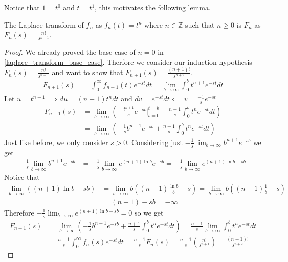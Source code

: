 \documentclass[notes]{subfiles}
\begin{document}
Notice that $1 = t^0$ and $t = t^1$, this motivates the following lemma.

\begin{lemma}
    The Laplace transform of $f_n$ as $f_n(t) = t^n$ where $n \in \mathbb{Z}$ such that $n \geq 0$ is $F_n$ as $F_n(s) = \frac{n!}{s^{n + 1}}$.
\end{lemma}
\begin{proof}
    We already proved the base case of $n = 0$ in \cref{laplace_transform_base_case}. Therfore we consider our induction hypothesis $F_n(s) = \frac{n!}{s^{n + 1}}$   and want to show that $F_{n + 1}(s) = \frac{(n + 1)!}{s^{n + 2}}$.
    \begin{align*}
        F_{n + 1}(s)
        &= \int_0^\infty f_{n + 1}(t)e^{-st}dt
        = \lim_{b\to\infty} \int_0^b t^{n + 1}e^{-st}dt
    \end{align*}
    Let $u = t^{n + 1} \implies du = (n + 1)t^ndt$ and $dv = e^{-st}dt \impliedby v = \frac{-1}{s}e^{-st}$
    \begin{align*}
        F_{n + 1}(s)
        &= \lim_{b\to\infty} \left( -\frac{t^{n + 1}}{s}e^{-st}\Big|_{t = 0}^{t = b} + \frac{n + 1}{s}\int_0^b t^n e^{-st}dt \right) \\
        &= \lim_{b\to\infty} \left( -\frac{1}{s}b^{n + 1}e^{-sb} + \frac{n + 1}{s}\int_0^b t^n e^{-st}dt \right)
    \end{align*}
    Just like before, we only consider $s > 0$. Considering just $-\frac{1}{s}\lim_{b\to\infty} b^{n + 1}e^{-sb}$ we get
    \begin{align*}
        -\frac{1}{s}\lim_{b\to\infty} b^{n + 1}e^{-sb}
        &= -\frac{1}{s}\lim_{b\to\infty} e^{(n + 1)\ln b}e^{-sb}
        = -\frac{1}{s}\lim_{b\to\infty} e^{(n + 1)\ln b - sb}
    \end{align*}
    Notice that
    \begin{align*}
        \lim_{b\to\infty} ((n + 1)\ln b - sb)
        &= \lim_{b\to\infty} b\left((n + 1)\frac{\ln b}{b} - s\right)
        = \lim_{b\to\infty} b\left((n + 1)\frac{1}{b} - s\right) \\
        &= (n + 1) - sb
        = -\infty
    \end{align*}
    Therefore $-\frac{1}{s}\lim_{b\to\infty} e^{(n + 1)\ln b - sb} = 0$ so we get
    \begin{align*}
        F_{n + 1}(s)
        &= \lim_{b\to\infty} \left( -\frac{1}{s}b^{n + 1}e^{-sb} + \frac{n + 1}{s}\int_0^b t^n e^{-st}dt \right)
        = \frac{n + 1}{s}\lim_{b\to\infty} \int_0^b t^n e^{-st}dt \\
        &= \frac{n + 1}{s} \int_0^\infty f_n(s) e^{-st}dt
        = \frac{n + 1}{s} F_n(s)
        = \frac{n + 1}{s} \left( \frac{n!}{s^{n + 1}} \right)
        = \frac{(n + 1)!}{s^{n + 2}}
    \end{align*}
\end{proof}
\end{document}

